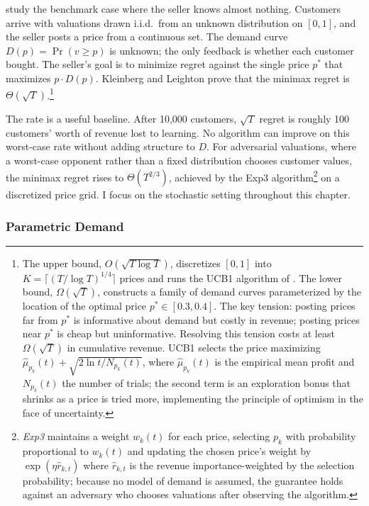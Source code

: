 \citet{Kleinberg2003} study the benchmark case where the seller knows almost nothing. Customers arrive with valuations drawn i.i.d.\ from an unknown distribution on $[0,1]$, and the seller posts a price from a continuous set. The demand curve $D(p) = \Pr(v \geq p)$ is unknown; the only feedback is whether each customer bought. The seller's goal is to minimize regret against the single price $p^*$ that maximizes $p \cdot D(p)$. Kleinberg and Leighton prove that the minimax regret is $\Theta(\sqrt{T})$.\footnote{The upper bound, $O(\sqrt{T \log T})$, discretizes $[0,1]$ into $K = \lceil (T/\log T)^{1/4} \rceil$ prices and runs the UCB1 algorithm of \citet{auer2002}. The lower bound, $\Omega(\sqrt{T})$, constructs a family of demand curves parameterized by the location of the optimal price $p^* \in [0.3, 0.4]$. The key tension: posting prices far from $p^*$ is informative about demand but costly in revenue; posting prices near $p^*$ is cheap but uninformative. Resolving this tension costs at least $\Omega(\sqrt{T})$ in cumulative revenue. UCB1 \citep{auer2002} selects the price maximizing $\hat{\mu}_{p_k}(t) + \sqrt{2\ln t / N_{p_k}(t)}$, where $\hat{\mu}_{p_k}(t)$ is the empirical mean profit and $N_{p_k}(t)$ the number of trials; the second term is an exploration bonus that shrinks as a price is tried more, implementing the principle of optimism in the face of uncertainty.}

The rate is a useful baseline. After 10,000 customers, $\sqrt{T}$ regret is roughly 100 customers' worth of revenue lost to learning. No algorithm can improve on this worst-case rate without adding structure to $D$. For adversarial valuations, where a worst-case opponent rather than a fixed distribution chooses customer values, the minimax regret rises to $\Theta(T^{2/3})$, achieved by the Exp3 algorithm\footnote{\emph{Exp3} \citep{auer2002nonstochastic} maintains a weight $w_k(t)$ for each price, selecting $p_k$ with probability proportional to $w_k(t)$ and updating the chosen price's weight by $\exp(\eta \hat{r}_{k,t})$ where $\hat{r}_{k,t}$ is the revenue importance-weighted by the selection probability; because no model of demand is assumed, the guarantee holds against an adversary who chooses valuations after observing the algorithm.} on a discretized price grid. I focus on the stochastic setting throughout this chapter.

\subsubsection{Parametric Demand}
\label{sec:broder}

